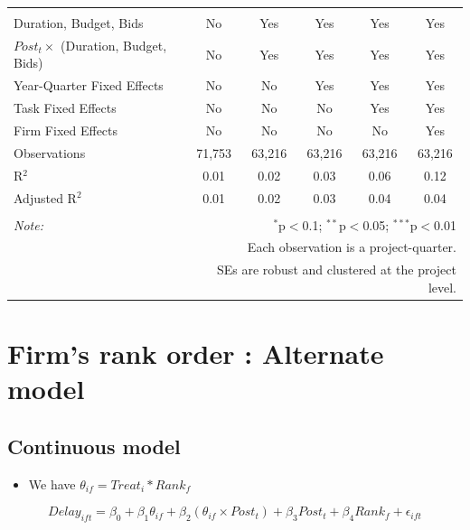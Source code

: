 \documentclass[
]{article}
\providecommand{\tightlist}{%
  \setlength{\itemsep}{0pt}\setlength{\parskip}{0pt}}
\begin{document}
\begin{table}[H]
\begin{tabular}{@{\extracolsep{-2pt}}lccccc}
  & & & & & \\ 
\hline \\[-1.8ex] 
Duration, Budget, Bids & No & Yes & Yes & Yes & Yes \\ 
$Post_t \times$  (Duration, Budget, Bids) & No & Yes & Yes & Yes & Yes \\ 
Year-Quarter Fixed Effects & No & No & Yes & Yes & Yes \\ 
Task Fixed Effects & No & No & No & Yes & Yes \\ 
Firm Fixed Effects & No & No & No & No & Yes \\ 
Observations & 71,753 & 63,216 & 63,216 & 63,216 & 63,216 \\ 
R$^{2}$ & 0.01 & 0.02 & 0.03 & 0.06 & 0.12 \\ 
Adjusted R$^{2}$ & 0.01 & 0.02 & 0.03 & 0.04 & 0.04 \\ 
\hline 
\hline \\[-1.8ex] 
\textit{Note:}  & \multicolumn{5}{r}{$^{*}$p$<$0.1; $^{**}$p$<$0.05; $^{***}$p$<$0.01} \\ 
 & \multicolumn{5}{r}{Each observation is a project-quarter.} \\ 
 & \multicolumn{5}{r}{SEs are robust and clustered at the project level.} \\ 
\end{tabular} 
\end{table}

\hypertarget{firms-rank-order-alternate-model}{%
\section{Firm's rank order : Alternate
model}\label{firms-rank-order-alternate-model}}

\hypertarget{continuous-model}{%
\subsection{Continuous model}\label{continuous-model}}

\begin{itemize}
\tightlist
\item
  We have \(\theta_{if} = Treat_i * Rank_f\)
\end{itemize}

\[ Delay_{ift} = \beta_0 + \beta_1 \theta_{if} + \beta_2 (\theta_{if} \times Post_t) + \beta_3 Post_t + \beta_4 Rank_f + \epsilon_{ift} \]
\end{document}
